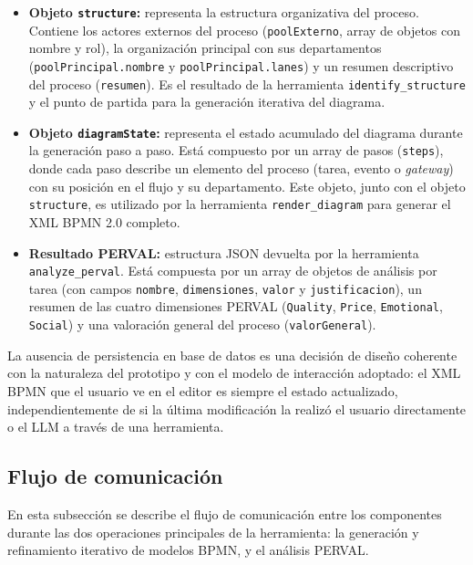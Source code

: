 \begin{itemize}
    \item[$\bullet$] \textbf{Objeto \texttt{structure}:} representa la estructura organizativa del proceso. Contiene los actores externos del proceso (\texttt{poolExterno}, array de objetos con nombre y rol), la organización principal con sus departamentos (\texttt{poolPrincipal.nombre} y \texttt{poolPrincipal.lanes}) y un resumen descriptivo del proceso (\texttt{resumen}). Es el resultado de la herramienta \texttt{identify\_structure} y el punto de partida para la generación iterativa del diagrama.

    \item[$\bullet$] \textbf{Objeto \texttt{diagramState}:} representa el estado acumulado del diagrama durante la generación paso a paso. Está compuesto por un array de pasos (\texttt{steps}), donde cada paso describe un elemento del proceso (tarea, evento o \textit{gateway}) con su posición en el flujo y su departamento. Este objeto, junto con el objeto \texttt{structure}, es utilizado por la herramienta \texttt{render\_diagram} para generar el XML BPMN 2.0 completo.

    \item[$\bullet$] \textbf{Resultado PERVAL:} estructura JSON devuelta por la herramienta \texttt{analyze\_perval}. Está compuesta por un array de objetos de análisis por tarea (con campos \texttt{nombre}, \texttt{dimensiones}, \texttt{valor} y \texttt{justificacion}), un resumen de las cuatro dimensiones PERVAL (\texttt{Quality}, \texttt{Price}, \texttt{Emotional}, \texttt{Social}) y una valoración general del proceso (\texttt{valorGeneral}).
\end{itemize}

La ausencia de persistencia en base de datos es una decisión de diseño coherente con la naturaleza del prototipo y con el modelo de interacción adoptado: el XML BPMN que el usuario ve en el editor es siempre el estado actualizado, independientemente de si la última modificación la realizó el usuario directamente o el LLM a través de una herramienta.

\subsection{Flujo de comunicación}

En esta subsección se describe el flujo de comunicación entre los componentes durante las dos operaciones principales de la herramienta: la generación y refinamiento iterativo de modelos BPMN, y el análisis PERVAL.

